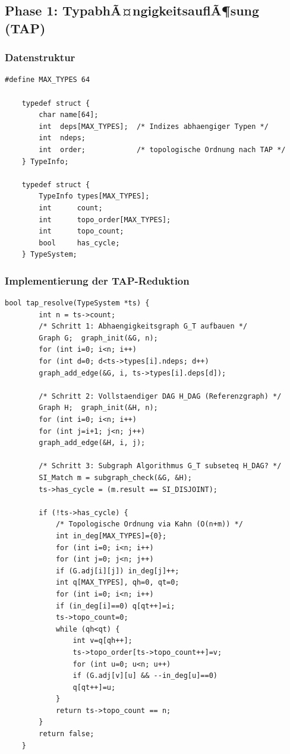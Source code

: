 ﻿\documentclass[a4paper,12pt]{article}
\theoremstyle{definition}
\begin{document}
\subsection{Phase 1: TypabhÃ¤ngigkeitsauflÃ¶sung (TAP)}
\label{sec:impl-tap}

\subsubsection{Datenstruktur}

\begin{lstlisting}[style=cstyle, caption={Typsystem (compiler.h)},
	label=lst:tap-ds]
	#define MAX_TYPES 64
	
	typedef struct {
		char name[64];
		int  deps[MAX_TYPES];  /* Indizes abhaengiger Typen */
		int  ndeps;
		int  order;            /* topologische Ordnung nach TAP */
	} TypeInfo;
	
	typedef struct {
		TypeInfo types[MAX_TYPES];
		int      count;
		int      topo_order[MAX_TYPES];
		int      topo_count;
		bool     has_cycle;
	} TypeSystem;
\end{lstlisting}

\subsubsection{Implementierung der TAP-Reduktion}

\begin{lstlisting}[style=cstyle, caption={TAP -- Reduktion auf SI
		(compiler\_full.c)}, label=lst:tap-impl]
	bool tap_resolve(TypeSystem *ts) {
		int n = ts->count;
		/* Schritt 1: Abhaengigkeitsgraph G_T aufbauen */
		Graph G;  graph_init(&G, n);
		for (int i=0; i<n; i++)
		for (int d=0; d<ts->types[i].ndeps; d++)
		graph_add_edge(&G, i, ts->types[i].deps[d]);
		
		/* Schritt 2: Vollstaendiger DAG H_DAG (Referenzgraph) */
		Graph H;  graph_init(&H, n);
		for (int i=0; i<n; i++)
		for (int j=i+1; j<n; j++)
		graph_add_edge(&H, i, j);
		
		/* Schritt 3: Subgraph Algorithmus G_T subseteq H_DAG? */
		SI_Match m = subgraph_check(&G, &H);
		ts->has_cycle = (m.result == SI_DISJOINT);
		
		if (!ts->has_cycle) {
			/* Topologische Ordnung via Kahn (O(n+m)) */
			int in_deg[MAX_TYPES]={0};
			for (int i=0; i<n; i++)
			for (int j=0; j<n; j++)
			if (G.adj[i][j]) in_deg[j]++;
			int q[MAX_TYPES], qh=0, qt=0;
			for (int i=0; i<n; i++)
			if (in_deg[i]==0) q[qt++]=i;
			ts->topo_count=0;
			while (qh<qt) {
				int v=q[qh++];
				ts->topo_order[ts->topo_count++]=v;
				for (int u=0; u<n; u++)
				if (G.adj[v][u] && --in_deg[u]==0)
				q[qt++]=u;
			}
			return ts->topo_count == n;
		}
		return false;
	}
\end{lstlisting}
\end{document}

